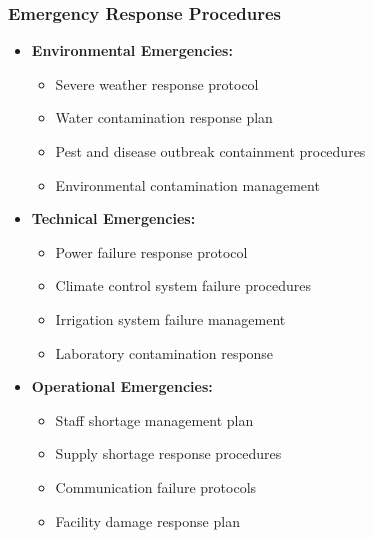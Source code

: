 \subsubsection{Emergency Response Procedures}
\begin{itemize}
    \item \textbf{Environmental Emergencies:}
    \begin{itemize}
        \item Severe weather response protocol
        \item Water contamination response plan
        \item Pest and disease outbreak containment procedures
        \item Environmental contamination management
    \end{itemize}
    
    \item \textbf{Technical Emergencies:}
    \begin{itemize}
        \item Power failure response protocol
        \item Climate control system failure procedures
        \item Irrigation system failure management
        \item Laboratory contamination response
    \end{itemize}
    
    \item \textbf{Operational Emergencies:}
    \begin{itemize}
        \item Staff shortage management plan
        \item Supply shortage response procedures
        \item Communication failure protocols
        \item Facility damage response plan
    \end{itemize}
\end{itemize}

